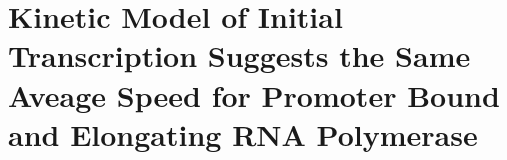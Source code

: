 \documentclass[]{ntnuthesis}
\begin{document}
\chapter*{Kinetic Model of Initial Transcription Suggests the Same Aveage Speed for Promoter Bound and Elongating RNA Polymerase}
\label{kinetic_paper_attached}

\end{document}
